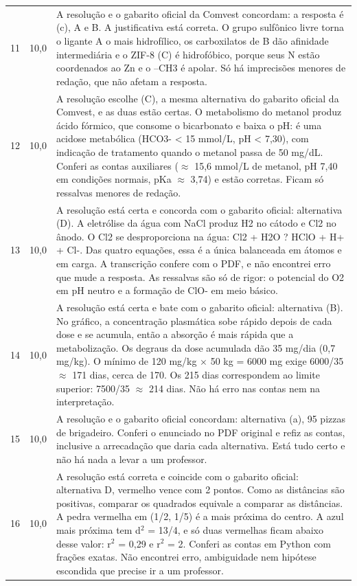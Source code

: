 \documentclass{article}%
\begin{document}
\begin{longtable}{@{}c c p{}@{}}
11 & 10,0 & A resolução e o gabarito oficial da Comvest concordam: a resposta é (c), A e B. A justificativa está correta. O grupo sulfônico livre torna o ligante A o mais hidrofílico, os carboxilatos de B dão afinidade intermediária e o ZIF{-}8 (C) é hidrofóbico, porque seus N estão coordenados ao Zn e o --CH3 é apolar. Só há imprecisões menores de redação, que não afetam a resposta. \\
12 & 10,0 & A resolução escolhe (C), a mesma alternativa do gabarito oficial da Comvest, e as duas estão certas. O metabolismo do metanol produz ácido fórmico, que consome o bicarbonato e baixa o pH: é uma acidose metabólica (HCO3{-} < 15 mmol/L, pH < 7,30), com indicação de tratamento quando o metanol passa de 50 mg/dL. Conferi as contas auxiliares ($\approx$ 15,6 mmol/L de metanol, pH 7,40 em condições normais, pKa $\approx$ 3,74) e estão corretas. Ficam só ressalvas menores de redação. \\
13 & 10,0 & A resolução está certa e concorda com o gabarito oficial: alternativa (D). A eletrólise da água com NaCl produz H2 no cátodo e Cl2 no ânodo. O Cl2 se desproporciona na água: Cl2 + H2O ? HClO + H+ + Cl{-}. Das quatro equações, essa é a única balanceada em átomos e em carga. A transcrição confere com o PDF, e não encontrei erro que mude a resposta. As ressalvas são só de rigor: o potencial do O2 em pH neutro e a formação de ClO{-} em meio básico. \\
14 & 10,0 & A resolução está certa e bate com o gabarito oficial: alternativa (B). No gráfico, a concentração plasmática sobe rápido depois de cada dose e se acumula, então a absorção é mais rápida que a metabolização. Os degraus da dose acumulada dão 35 mg/dia (0,7 mg/kg). O mínimo de 120 mg/kg $\times$ 50 kg = 6000 mg exige 6000/35 $\approx$ 171 dias, cerca de 170. Os 215 dias correspondem ao limite superior: 7500/35 $\approx$ 214 dias. Não há erro nas contas nem na interpretação. \\
15 & 10,0 & A resolução e o gabarito oficial concordam: alternativa (a), 95 pizzas de brigadeiro. Conferi o enunciado no PDF original e refiz as contas, inclusive a arrecadação que daria cada alternativa. Está tudo certo e não há nada a levar a um professor. \\
16 & 10,0 & A resolução está correta e coincide com o gabarito oficial: alternativa D, vermelho vence com 2 pontos. Como as distâncias são positivas, comparar os quadrados equivale a comparar as distâncias. A pedra vermelha em (1/2, 1/5) é a mais próxima do centro. A azul mais próxima tem d$^2$ = 13/4, e só duas vermelhas ficam abaixo desse valor: r$^2$ = 0,29 e r$^2$ = 2. Conferi as contas em Python com frações exatas. Não encontrei erro, ambiguidade nem hipótese escondida que precise ir a um professor. \\

\end{longtable}
\end{document}
